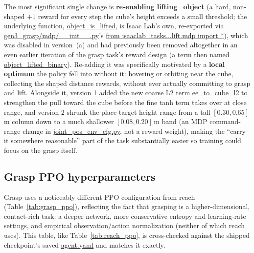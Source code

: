 \documentclass[11pt]{article}
\begin{document}
The most significant single change is \textbf{re-enabling \url{lifting_object}}
(a hard, non-shaped $+1$ reward for every step the cube's height exceeds a small
threshold; the underlying function, \url{object_is_lifted}, is Isaac Lab's own,
re-exported via \url{gen3_grasp/mdp/__init__.py}'s
\url{from isaaclab_tasks...lift.mdp import *}), which was disabled in version~(a)
and had previously been removed altogether in an even earlier iteration of the
grasp task's reward design (a term then named \url{object_lifted_binary}).
Re-adding it was
specifically motivated by a \textbf{local optimum} the policy fell into without it:
hovering or orbiting near the cube, collecting the shaped distance rewards, without
ever actually committing to grasp and lift. Alongside it, version 1 added the
new coarse L2 term \url{ee_to_cube_l2} to strengthen the pull toward the cube
before the fine tanh term takes over at close range, and version 2 shrunk the
place-target height range from a tall $[0.30, 0.65]$\,m column down to a much
shallower $[0.08, 0.20]$\,m band (an MDP command-range change in
\url{joint_pos_env_cfg.py}, not a reward weight), making the ``carry it
somewhere reasonable'' part of the task substantially easier so training could
focus on the grasp itself.

\subsection{Grasp PPO hyperparameters}

Grasp uses a noticeably different PPO configuration from reach
(Table~\ref{tab:grasp_ppo}), reflecting the fact that grasping is a
higher-dimensional, contact-rich task: a deeper network, more conservative
entropy and learning-rate settings, and empirical observation/action
normalization (neither of which reach uses). This table, like
Table~\ref{tab:reach_ppo}, is cross-checked against the shipped checkpoint's saved
\url{agent.yaml} and matches it exactly.
\end{document}
